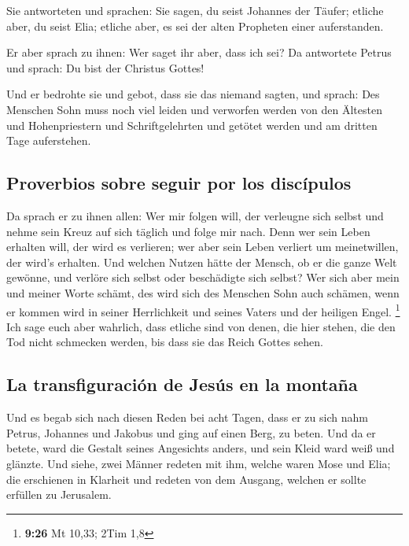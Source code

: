  Sie antworteten und sprachen: Sie sagen, du seist
Johannes der Täufer; etliche aber, du seist Elia; etliche aber, es sei
der alten Propheten einer auferstanden.

 Er aber sprach zu ihnen: Wer saget ihr aber, dass ich
sei? Da antwortete Petrus und sprach: Du bist der Christus Gottes!

 Und er bedrohte sie und gebot, dass sie das niemand
sagten,  und sprach: Des Menschen Sohn muss noch viel
leiden und verworfen werden von den Ältesten und Hohenpriestern und
Schriftgelehrten und getötet werden und am dritten Tage auferstehen.

\hypertarget{proverbios-sobre-seguir-por-los-discuxedpulos}{%
\subsection{Proverbios sobre seguir por los
discípulos}\label{proverbios-sobre-seguir-por-los-discuxedpulos}}

 Da sprach er zu ihnen allen: Wer mir folgen will, der
verleugne sich selbst und nehme sein Kreuz auf sich täglich und folge
mir nach.  Denn wer sein Leben erhalten will, der wird es
verlieren; wer aber sein Leben verliert um meinetwillen, der wird's
erhalten.  Und welchen Nutzen hätte der Mensch, ob er die
ganze Welt gewönne, und verlöre sich selbst oder beschädigte sich
selbst?  Wer sich aber mein und meiner Worte schämt, des
wird sich des Menschen Sohn auch schämen, wenn er kommen wird in seiner
Herrlichkeit und seines Vaters und der heiligen Engel. \footnote{\textbf{9:26}
  Mt 10,33; 2Tim 1,8}  Ich sage euch aber wahrlich, dass
etliche sind von denen, die hier stehen, die den Tod nicht schmecken
werden, bis dass sie das Reich Gottes sehen.

\hypertarget{la-transfiguraciuxf3n-de-jesuxfas-en-la-montauxf1a}{%
\subsection{La transfiguración de Jesús en la
montaña}\label{la-transfiguraciuxf3n-de-jesuxfas-en-la-montauxf1a}}

 Und es begab sich nach diesen Reden bei acht Tagen, dass
er zu sich nahm Petrus, Johannes und Jakobus und ging auf einen Berg, zu
beten.  Und da er betete, ward die Gestalt seines
Angesichts anders, und sein Kleid ward weiß und glänzte. 
Und siehe, zwei Männer redeten mit ihm, welche waren Mose und Elia;
 die erschienen in Klarheit und redeten von dem Ausgang,
welchen er sollte erfüllen zu Jerusalem.

